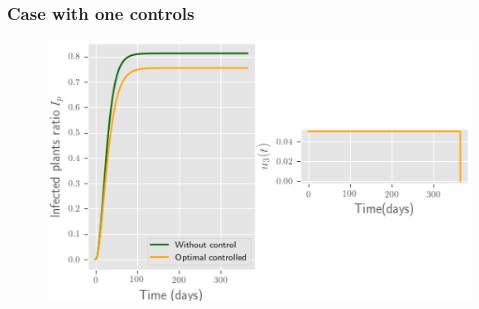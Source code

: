 	\begin{frame}[plain]
	\frametitle{Case with one controls}
	\begin{figure}
		\centering	
		\includegraphics[scale=0.5]{Feathergraphics/one_control_simulation_1.eps}
	\end{figure}	
\end{frame}


